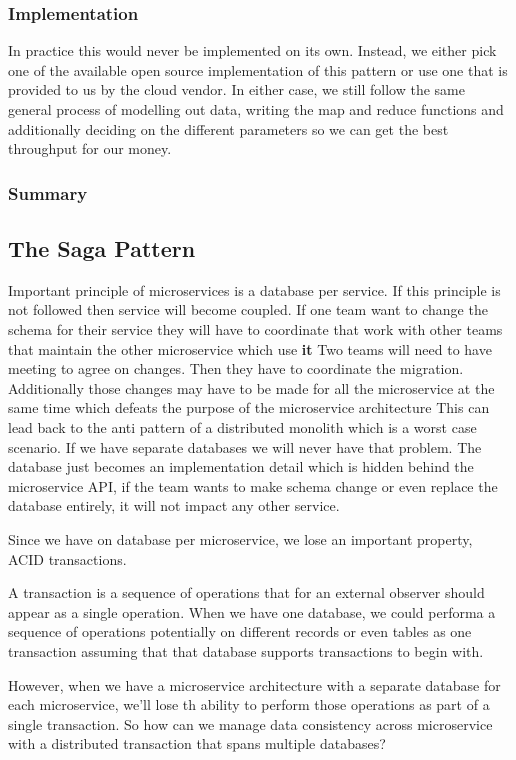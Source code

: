 \subsubsection{Implementation}
In practice this would never be implemented on its own.
Instead, we either pick one of the available open source implementation of this pattern or use one that is provided to us by the cloud vendor.
In either case, we still follow the same general process of modelling out data, writing the map and reduce functions and additionally deciding on the different parameters so we can get the best throughput for our money.

\subsubsection{Summary}

\subsection{The Saga Pattern}
Important principle of microservices is a database per service.
If this principle is not followed then service will become coupled.
If one team want to change the schema for their service they will have to coordinate that work with other teams that maintain the other microservice which use \textbf{it}
Two teams will need to have meeting to agree on changes.
Then they have to coordinate the migration.
Additionally those changes may have to be made for all the microservice at the same time which defeats the purpose of the microservice architecture
This can lead back to the anti pattern of a distributed monolith which is a worst case scenario.
If we have separate databases we will never have that problem.
The database just becomes an implementation detail which is hidden behind the microservice API, if the team wants to make schema change or even replace the database entirely, it will not impact any other service.

Since we have on database per microservice, we lose an important property, ACID transactions.

A transaction is a sequence of operations that for an external observer should appear as a single operation.
When we have one database, we could performa a sequence of operations potentially on different records or even tables as one transaction assuming that that database supports transactions to begin with.

However, when we have a microservice architecture with a separate database for each microservice, we'll lose th ability to perform those operations as part of a single transaction.
So how can we manage data consistency across microservice with a distributed transaction that spans multiple databases?

